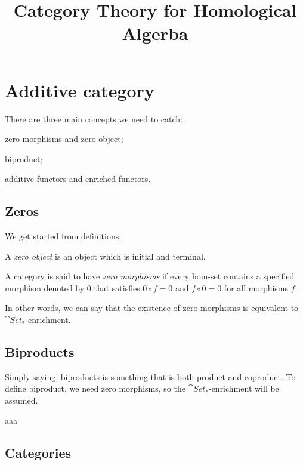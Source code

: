 \documentclass{../exp}
\title{Category Theory for Homological Algerba}
\begin{document}
\maketitle


\section{Additive category}

There are three main concepts we need to catch:
\begin{cond}
\item zero morphisms and zero object;
\item biproduct;
\item additive functors and enriched functors.
\end{cond}

\subsection{Zeros}
We get started from definitions.
\begin{defn}
A \emph{zero object} is an object which is initial and terminal.
\end{defn}
\begin{defn}
A category is said to have \emph{zero morphisms} if every hom-set contains a specified morphism denoted by 0 that satisfies $0\circ f=0$ and $f\circ 0=0$ for all morphisms $f$.
\end{defn}


In other words, we can say that the existence of zero morphisms is equivalent to $\cat{Set_*}$-enrichment.


\subsection{Biproducts}
Simply saying, biproducts is something that is both product and coproduct.
To define biproduct, we need zero morphisms, so the $\cat{Set_*}$-enrichment will be assumed.
\begin{defn}
aaa
\end{defn}





\subsection{Categories}
\end{document}
